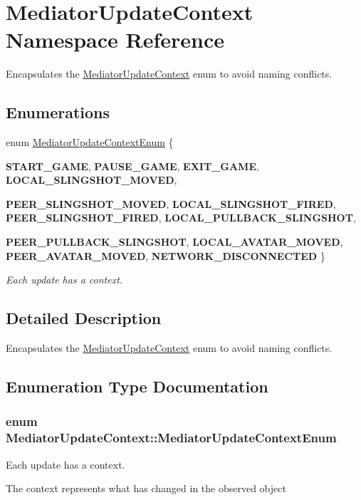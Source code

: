 \hypertarget{namespaceMediatorUpdateContext}{
\section{MediatorUpdateContext Namespace Reference}
\label{namespaceMediatorUpdateContext}
}


Encapsulates the \hyperlink{namespaceMediatorUpdateContext}{MediatorUpdateContext} enum to avoid naming conflicts.  


\subsection*{Enumerations}
\begin{DoxyCompactItemize}
\item 
enum \hyperlink{namespaceMediatorUpdateContext_aa3a9bed543f2a2237dc2b6feea170a1d}{MediatorUpdateContextEnum} \{ \par
{\bfseries START\_\-GAME}, 
{\bfseries PAUSE\_\-GAME}, 
{\bfseries EXIT\_\-GAME}, 
{\bfseries LOCAL\_\-SLINGSHOT\_\-MOVED}, 
\par
{\bfseries PEER\_\-SLINGSHOT\_\-MOVED}, 
{\bfseries LOCAL\_\-SLINGSHOT\_\-FIRED}, 
{\bfseries PEER\_\-SLINGSHOT\_\-FIRED}, 
{\bfseries LOCAL\_\-PULLBACK\_\-SLINGSHOT}, 
\par
{\bfseries PEER\_\-PULLBACK\_\-SLINGSHOT}, 
{\bfseries LOCAL\_\-AVATAR\_\-MOVED}, 
{\bfseries PEER\_\-AVATAR\_\-MOVED}, 
{\bfseries NETWORK\_\-DISCONNECTED}
 \}
\begin{DoxyCompactList}\small\item\em Each update has a context. \item\end{DoxyCompactList}\end{DoxyCompactItemize}


\subsection{Detailed Description}
Encapsulates the \hyperlink{namespaceMediatorUpdateContext}{MediatorUpdateContext} enum to avoid naming conflicts. 

\subsection{Enumeration Type Documentation}
\hypertarget{namespaceMediatorUpdateContext_aa3a9bed543f2a2237dc2b6feea170a1d}{
\subsubsection[{MediatorUpdateContextEnum}]{\setlength{\rightskip}{0pt plus 5cm}enum {\bf MediatorUpdateContext::MediatorUpdateContextEnum}}}
\label{namespaceMediatorUpdateContext_aa3a9bed543f2a2237dc2b6feea170a1d}


Each update has a context. 

The context represents what has changed in the observed object 